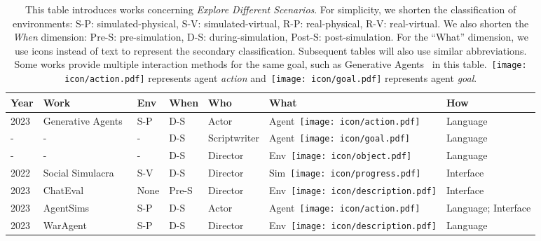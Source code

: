 
\begin{table}[ht]
  \caption{This table introduces works concerning \textit{Explore Different Scenarios}. For simplicity, we
shorten the classification of environments: S-P: simulated-physical, S-V: simulated-virtual, R-P: real-physical, R-V: real-virtual. We also shorten the \textit{When} dimension: Pre-S: pre-simulation, D-S: during-simulation, Post-S: post-simulation. For the ``What'' dimension, we use icons instead of text to represent the secondary classification. Subsequent tables will also use similar abbreviations. Some works provide multiple interaction methods for the same goal, such as Generative Agents~\cite{10.1145/3586183.3606763} in this table.~\texttt{[image: icon/action.pdf]} represents agent \textit{action} and~\texttt{[image: icon/goal.pdf]} represents agent \textit{goal}.}
  \label{tab:explore}
  \begin{tabular}{lllllll}
    \toprule
    \textbf{Year}&\textbf{Work} & \textbf{Env}&\textbf{When} & \textbf{Who} & \textbf{What} & \textbf{How}\\
    \midrule
    
2023&Generative Agents~\cite{10.1145/3586183.3606763} & S-P & D-S  & Actor &Agent~\texttt{[image: icon/action.pdf]}& Language \\

-& -& -& D-S & Scriptwriter &Agent~\texttt{[image: icon/goal.pdf]}& Language \\

-& -& -& D-S & Director &Env~\texttt{[image: icon/object.pdf]}& Language \\

2022&Social Simulacra~\cite{10.1145/3526113.3545616}& S-V & D-S  & Director &Sim~\texttt{[image: icon/progress.pdf]}& Interface \\

2023&ChatEval~\cite{chan2023chatevalbetterllmbasedevaluators}&None & Pre-S & Director &Env~\texttt{[image: icon/description.pdf]}&Interface \\

2023&AgentSims~\cite{lin2023agentsimsopensourcesandboxlarge}&S-P  & D-S  & Actor &Agent~\texttt{[image: icon/action.pdf]}&Language; Interface \\

2023&WarAgent~\cite{hua2024warpeacewaragentlarge}
&S-P  & D-S  & Director &Env~\texttt{[image: icon/description.pdf]}&Language \\


\end{tabular}
\end{table}
